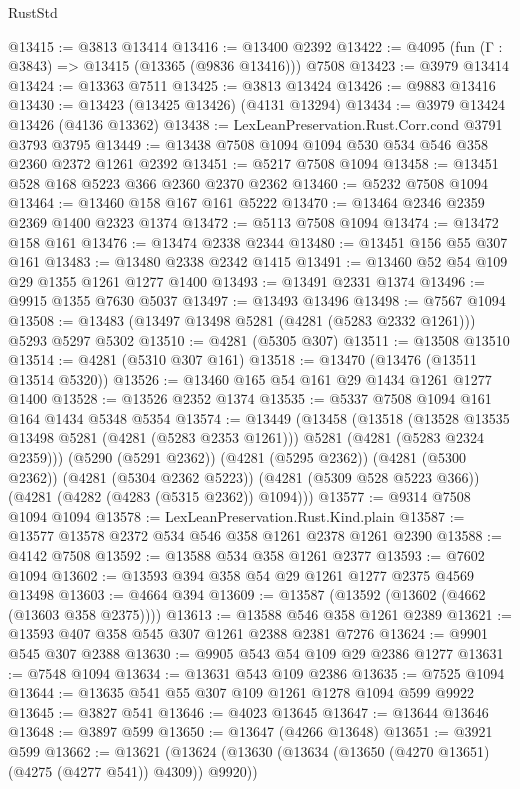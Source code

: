 \begin{lexlean}{RustStd}
\begin{coremodule}
{\begin{coremodule}
{{{{{{{{{{{{{{{{{{{{{{{{{{{{{{{{{{{@13415 := @3813 @13414
@13416 := @13400 @2392
@13422 := @4095 (fun (Γ : @3843) => @13415 (@13365 (@9836 @13416))) @7508
@13423 := @3979 @13414
@13424 := @13363 @7511
@13425 := @3813 @13424
@13426 := @9883 @13416
@13430 := @13423 (@13425 @13426) (@4131 @13294)
@13434 := @3979 @13424 @13426 (@4136 @13362)
@13438 := LexLeanPreservation.Rust.Corr.cond @3791 @3793 @3795
@13449 := @13438 @7508 @1094 @1094 @530 @534 @546 @358 @2360 @2372 @1261 @2392
@13451 := @5217 @7508 @1094
@13458 := @13451 @528 @168 @5223 @366 @2360 @2370 @2362
@13460 := @5232 @7508 @1094
@13464 := @13460 @158 @167 @161 @5222
@13470 := @13464 @2346 @2359 @2369 @1400 @2323 @1374
@13472 := @5113 @7508 @1094
@13474 := @13472 @158 @161
@13476 := @13474 @2338 @2344
@13480 := @13451 @156 @55 @307 @161
@13483 := @13480 @2338 @2342 @1415
@13491 := @13460 @52 @54 @109 @29 @1355 @1261 @1277 @1400
@13493 := @13491 @2331 @1374
@13496 := @9915 @1355 @7630 @5037
@13497 := @13493 @13496
@13498 := @7567 @1094
@13508 := @13483 (@13497 @13498 @5281 (@4281 (@5283 @2332 @1261))) @5293 @5297 @5302
@13510 := @4281 (@5305 @307)
@13511 := @13508 @13510
@13514 := @4281 (@5310 @307 @161)
@13518 := @13470 (@13476 (@13511 @13514 @5320))
@13526 := @13460 @165 @54 @161 @29 @1434 @1261 @1277 @1400
@13528 := @13526 @2352 @1374
@13535 := @5337 @7508 @1094 @161 @164 @1434 @5348 @5354
@13574 := @13449
    (@13458
      (@13518
        (@13528 @13535 @13498 @5281 (@4281 (@5283 @2353 @1261)))
        @5281
        (@4281 (@5283 @2324 @2359)))
      (@5290 (@5291 @2362))
      (@4281 (@5295 @2362))
      (@4281 (@5300 @2362))
      (@4281 (@5304 @2362 @5223))
      (@4281 (@5309 @528 @5223 @366))
      (@4281 (@4282 (@4283 (@5315 @2362)) @1094)))
@13577 := @9314 @7508 @1094 @1094
@13578 := LexLeanPreservation.Rust.Kind.plain
@13587 := @13577 @13578 @2372 @534 @546 @358 @1261 @2378 @1261 @2390
@13588 := @4142 @7508
@13592 := @13588 @534 @358 @1261 @2377
@13593 := @7602 @1094
@13602 := @13593 @394 @358 @54 @29 @1261 @1277 @2375 @4569 @13498
@13603 := @4664 @394
@13609 := @13587 (@13592 (@13602 (@4662 (@13603 @358 @2375))))
@13613 := @13588 @546 @358 @1261 @2389
@13621 := @13593 @407 @358 @545 @307 @1261 @2388 @2381 @7276
@13624 := @9901 @545 @307 @2388
@13630 := @9905 @543 @54 @109 @29 @2386 @1277
@13631 := @7548 @1094
@13634 := @13631 @543 @109 @2386
@13635 := @7525 @1094
@13644 := @13635 @541 @55 @307 @109 @1261 @1278 @1094 @599 @9922
@13645 := @3827 @541
@13646 := @4023 @13645
@13647 := @13644 @13646
@13648 := @3897 @599
@13650 := @13647 (@4266 @13648)
@13651 := @3921 @599
@13662 := @13621 (@13624 (@13630 (@13634 (@13650 (@4270 @13651) (@4275 (@4277 @541)) @4309)) @9920))
}}}}}}}}}}}}}}}}}}}}}}}}}}}}}}}}}}}
\end{coremodule}}
\end{coremodule}
\end{lexlean}
